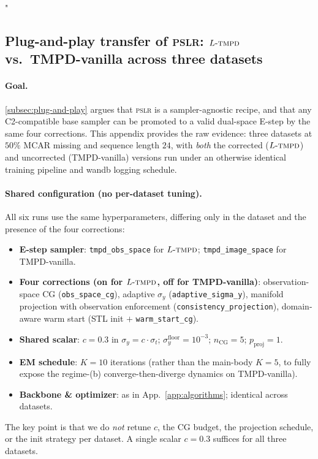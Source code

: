 "\documentclass{article}
\theoremstyle{plain}
\theoremstyle{definition}
\theoremstyle{remark}
\newcommand{\pslr}{\textsc{pslr}}
\newcommand{\ltmpd}{L\mbox{-}\textsc{tmpd}}
\begin{document}
\subsection{Plug-and-play transfer of \pslr{}: $\ltmpd$ vs.\ TMPD-vanilla across three datasets}
\label{app:ltmpd-transfer}

\paragraph{Goal.}
\cref{subsec:plug-and-play} argues that \pslr{} is a sampler-agnostic recipe, and that any C2-compatible base sampler can be promoted to a valid dual-space E-step by the same four corrections. This appendix provides the raw evidence: three datasets at $50\%$ MCAR missing and sequence length $24$, with \emph{both} the corrected ($\ltmpd$) and uncorrected (TMPD-vanilla) versions run under an otherwise identical training pipeline and wandb logging schedule.

\paragraph{Shared configuration (no per-dataset tuning).}
All six runs use the same hyperparameters, differing only in the dataset and the presence of the four corrections:
\begin{itemize}
\setlength{\itemsep}{0pt}
\item \textbf{E-step sampler}: \texttt{tmpd\_obs\_space} for $\ltmpd$; \texttt{tmpd\_image\_space} for TMPD-vanilla.
\item \textbf{Four corrections (on for $\ltmpd$, off for TMPD-vanilla)}: observation-space CG (\texttt{obs\_space\_cg}), adaptive $\sigma_y$ (\texttt{adaptive\_sigma\_y}), manifold projection with observation enforcement (\texttt{consistency\_projection}), domain-aware warm start (STL init $+$ \texttt{warm\_start\_cg}).
\item \textbf{Shared scalar}: $c = 0.3$ in $\sigma_y = c \cdot \sigma_t$; $\sigma_y^{\mathrm{floor}} = 10^{-3}$; $n_{\mathrm{CG}} = 5$; $p_{\mathrm{proj}} = 1$.
\item \textbf{EM schedule}: $K = 10$ iterations (rather than the main-body $K=5$, to fully expose the regime-(b) converge-then-diverge dynamics on TMPD-vanilla).
\item \textbf{Backbone \& optimizer}: as in App.~\ref{app:algorithms}; identical across datasets.
\end{itemize}

The key point is that we do \emph{not} retune $c$, the CG budget, the projection schedule, or the init strategy per dataset. A single scalar $c = 0.3$ suffices for all three datasets.
\end{document}

